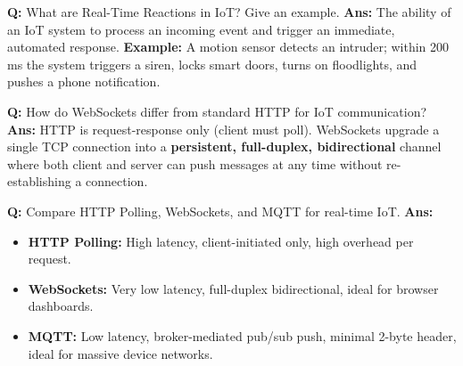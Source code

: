 \documentclass[10pt,a4paper,twocolumn]{article}
\begin{document}
\begin{tcolorbox}[
  colback=white,
  colframe=UnitColorSeven,
  colbacktitle=gray!10!white,
  coltitle=black,
  fonttitle=\bfseries\sffamily\small,
  title={Unit VII $\bullet$ Card 8},
  boxrule=1.2pt,
  arc=2mm,
  outer arc=2mm,
  boxsep=1.5mm,
  top=1mm,
  bottom=1mm,
  left=1.5mm,
  right=1.5mm,
  before skip=2.5mm,
  after skip=2.5mm
]
\textbf{Q:} What are Real-Time Reactions in IoT? Give an example.
\tcbline
\textbf{Ans:} The ability of an IoT system to process an incoming event and trigger an immediate, automated response. \textbf{Example:} A motion sensor detects an intruder; within 200 ms the system triggers a siren, locks smart doors, turns on floodlights, and pushes a phone notification.
\end{tcolorbox}


\begin{tcolorbox}[
  colback=white,
  colframe=UnitColorSeven,
  colbacktitle=gray!10!white,
  coltitle=black,
  fonttitle=\bfseries\sffamily\small,
  title={Unit VII $\bullet$ Card 9},
  boxrule=1.2pt,
  arc=2mm,
  outer arc=2mm,
  boxsep=1.5mm,
  top=1mm,
  bottom=1mm,
  left=1.5mm,
  right=1.5mm,
  before skip=2.5mm,
  after skip=2.5mm
]
\textbf{Q:} How do WebSockets differ from standard HTTP for IoT communication?
\tcbline
\textbf{Ans:} HTTP is request-response only (client must poll). WebSockets upgrade a single TCP connection into a \textbf{persistent, full-duplex, bidirectional} channel where both client and server can push messages at any time without re-establishing a connection.
\end{tcolorbox}


\begin{tcolorbox}[
  colback=white,
  colframe=UnitColorSeven,
  colbacktitle=gray!10!white,
  coltitle=black,
  fonttitle=\bfseries\sffamily\small,
  title={Unit VII $\bullet$ Card 10},
  boxrule=1.2pt,
  arc=2mm,
  outer arc=2mm,
  boxsep=1.5mm,
  top=1mm,
  bottom=1mm,
  left=1.5mm,
  right=1.5mm,
  before skip=2.5mm,
  after skip=2.5mm
]
\textbf{Q:} Compare HTTP Polling, WebSockets, and MQTT for real-time IoT.
\tcbline
\textbf{Ans:} \begin{itemize}
  \item \textbf{HTTP Polling:} High latency, client-initiated only, high overhead per request.
  \item \textbf{WebSockets:} Very low latency, full-duplex bidirectional, ideal for browser dashboards.
  \item \textbf{MQTT:} Low latency, broker-mediated pub/sub push, minimal 2-byte header, ideal for massive device networks.
\end{itemize}
\end{tcolorbox}
\end{document}
